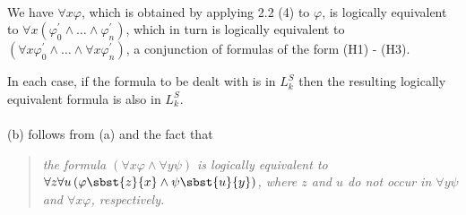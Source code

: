 \begin{enumerate}[1.]
\begin{enumerate}[(i)]
\ \\
We have $\forall x \varphi$, which is obtained by applying 2.2 (4) to $\varphi$, is logically equivalent to $\forall x (\varphi_0^\prime \land \ldots \land \varphi_n^\prime)$, which in turn is logically equivalent to $(\forall x \varphi_0^\prime \land \ldots \land \forall x \varphi_n^\prime)$, a conjunction of formulas of the form (H1) - (H3).
\end{enumerate}
In each case, if the formula to be dealt with is in $L_k^S$ then the resulting logically equivalent formula is also in $L_k^S$.\\
\ \\
(b) follows from (a) and the fact that
\begin{quote}
\emph{the formula $(\forall x \varphi \land \forall y \psi)$ is logically equivalent to $\forall z \forall u \left( \varphi\sbst{z}{x} \land \psi\sbst{u}{y} \right)$, where $z$ and $u$ do not occur in $\forall y \psi$ and $\forall x \varphi$, respectively.}
\end{quote}


\end{enumerate}

